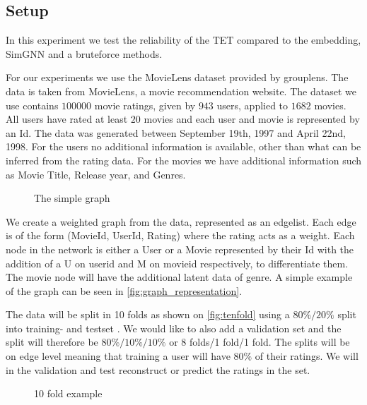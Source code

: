 \subsection{Setup}
In this experiment we test the reliability of the TET compared to the embedding, SimGNN and a bruteforce methods. 

For our experiments we use the MovieLens dataset provided by grouplens\cite{Grouplensdata}. The data is taken from MovieLens, a movie recommendation website. The dataset we use contains $100000$ movie ratings, given by $943$ users, applied to $1682$ movies. All users have rated at least $20$ movies and each user and movie is represented by an Id. The data was generated between September 19th, 1997 and April 22nd, 1998. For the users no additional information is available, other than what can be inferred from the rating data. For the movies we have additional information such as Movie Title, Release year, and Genres.

\begin{figure}[H]
	\centering
	\begin{adjustbox}{width=0.5\textwidth}
		
	\end{adjustbox}
	\caption{The simple graph}
	\label{fig:graph_representation}
\end{figure}

We create a weighted graph from the data, represented as an edgelist. Each edge is of the form (MovieId, UserId, Rating) where the rating acts as a weight. Each node in the network is either a User or a Movie represented by their Id with the addition of a U on userid and M on movieid respectively, to differentiate them. The movie node will have the additional latent data of genre. A simple example of the graph can be seen in \autoref{fig:graph_representation}.

The data will be split in 10 folds as shown on \autoref{fig:tenfold} using a $80\%/20\%$ split into training- and testset \cite{Ricci2015}. We would like to also add a validation set and the split will therefore be $80\%/10\%/10\%$ or 8 folds/1 fold/1 fold. The splits will be on edge level meaning that training a user will have $80\%$ of their ratings. We will in the validation and test reconstruct or predict the ratings in the set.

\begin{figure}[H]
	\centering
	\begin{adjustbox}{width=0.5\textwidth}
		
	\end{adjustbox}
	\caption{10 fold example}
	\label{fig:tenfold}
\end{figure}

